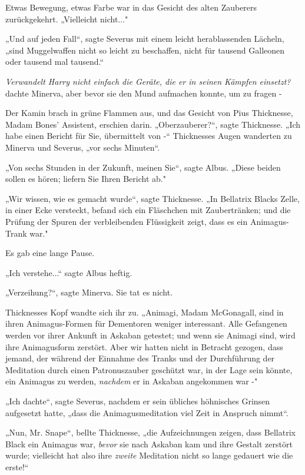 {Etwas Bewegung, etwas Farbe war in das Gesicht des alten Zauberers zurückgekehrt. „Vielleicht nicht..."

„Und auf jeden Fall“, sagte Severus mit einem leicht herablassenden Lächeln, „sind Muggelwaffen nicht so leicht zu beschaffen, nicht für tausend Galleonen oder tausend mal tausend.“

\emph{Verwandelt Harry nicht einfach die Geräte, die er in seinen Kämpfen einsetzt?} dachte Minerva, aber bevor sie den Mund aufmachen konnte, um zu fragen -

Der Kamin brach in grüne Flammen aus, und das Gesicht von Pius Thicknesse, Madam Bones' Assistent, erschien darin. „Oberzauberer?“, sagte Thicknesse. „Ich habe einen Bericht für Sie, übermittelt von -“ Thicknesses Augen wanderten zu Minerva und Severus, „vor sechs Minuten“.

„Von sechs Stunden in der Zukunft, meinen Sie“, sagte Albus. „Diese beiden sollen es hören; liefern Sie Ihren Bericht ab."

„Wir wissen, wie es gemacht wurde“, sagte Thicknesse. „In Bellatrix Blacks Zelle, in einer Ecke versteckt, befand sich ein Fläschchen mit Zaubertränken; und die Prüfung der Spuren der verbleibenden Flüssigkeit zeigt, dass es ein Animagus-Trank war."

Es gab eine lange Pause.

„Ich verstehe...“ sagte Albus heftig.

„Verzeihung?“, sagte Minerva. Sie tat es nicht.

Thicknesses Kopf wandte sich ihr zu. „Animagi, Madam McGonagall, sind in ihren Animagus-Formen für Dementoren weniger interessant. Alle Gefangenen werden vor ihrer Ankunft in Askaban getestet; und wenn sie Animagi sind, wird ihre Animagusform zerstört. Aber wir hatten nicht in Betracht gezogen, dass jemand, der während der Einnahme des Tranks und der Durchführung der Meditation durch einen Patronuszauber geschützt war, in der Lage sein könnte, ein Animagus zu werden, \emph{nachdem} er in Askaban angekommen war -"

„Ich dachte“, sagte Severus, nachdem er sein übliches höhnisches Grinsen aufgesetzt hatte, „dass die Animagusmeditation viel Zeit in Anspruch nimmt“.

„Nun, Mr. Snape“, bellte Thicknesse, „die Aufzeichnungen zeigen, dass Bellatrix Black ein Animagus war, \emph{bevor} sie nach Askaban kam und ihre Gestalt zerstört wurde; vielleicht hat also ihre \emph{zweite} Meditation nicht so lange gedauert wie die erste!“

}
